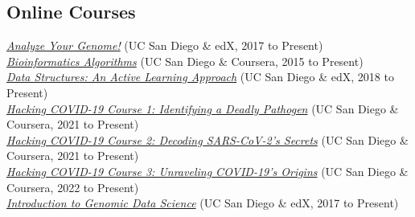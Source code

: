 \documentclass[margin,line]{res}
\begin{document}
\begin{resume}
\section{\sc Online Courses}
\href{https://www.edx.org/course/analyze-genome-uc-san-diegox-binf180-1}{\textit{Analyze Your Genome!}} (UC San Diego \& edX, 2017 to Present)\vspace{2mm}\\
\href{https://www.coursera.org/specializations/bioinformatics}{\textit{Bioinformatics Algorithms}} (UC San Diego \& Coursera, 2015 to Present)\vspace{2mm}\\
\href{https://www.edx.org/course/data-structures-an-active-learning-approach}{\textit{Data Structures: An Active Learning Approach}} (UC San Diego \& edX, 2018 to Present)\vspace{2mm}\\
\href{https://www.coursera.org/learn/covid-19-genome-assembly}{\textit{Hacking COVID-19 Course 1: Identifying a Deadly Pathogen}} (UC San Diego \& Coursera, 2021 to Present)\vspace{2mm}\\
\href{https://www.coursera.org/learn/covid-19-genome-annotation}{\textit{Hacking COVID-19 Course 2: Decoding SARS-CoV-2's Secrets}} (UC San Diego \& Coursera, 2021 to Present)\vspace{2mm}\\
\href{https://www.coursera.org/learn/hacking-covid-19--course-3-unraveling-origins-of-covid-19}{\textit{Hacking COVID-19 Course 3: Unraveling COVID-19's Origins}} (UC San Diego \& Coursera, 2022 to Present)\vspace{2mm}\\
\href{https://www.edx.org/course/introduction-genomic-data-science-uc-san-diegox-cse181-1x}{\textit{Introduction to Genomic Data Science}} (UC San Diego \& edX, 2017 to Present)


\end{resume}
\end{document}
